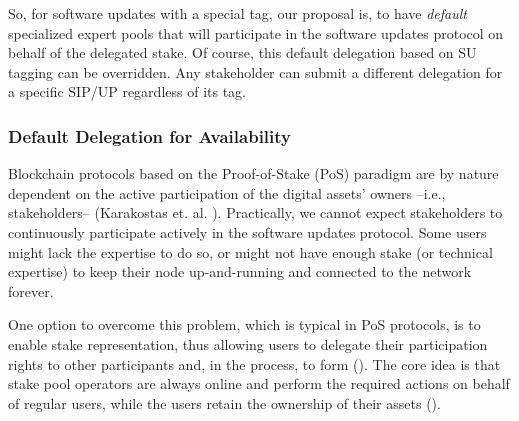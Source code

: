So, for software updates with a special tag, our proposal is, to have
\emph{default} specialized expert pools that will participate in the software
updates protocol on behalf of the delegated stake. Of course, this default
delegation based on SU tagging can be overridden. Any stakeholder can submit a
different delegation for a specific SIP/UP regardless of its tag.

\subsubsection{Default Delegation for Availability}\label{defaultdel}
Blockchain protocols based on the Proof-of-Stake (PoS) paradigm are by nature
dependent on the active participation of the digital assets' owners --i.e.,
stakeholders-- (Karakostas et. al. \cite{stakepools}). Practically, we cannot
expect stakeholders to continuously participate actively in the software updates
protocol. Some users might lack the expertise to do so, or might not have enough
stake (or technical expertise) to keep their node up-and-running and connected
to the network forever.

One option to overcome this problem, which is typical in PoS protocols, is to
enable stake representation, thus allowing users to delegate their participation
rights to other participants and, in the process, to form (\cite{stakepools}). The core idea is that stake pool operators are
always online and perform the required actions on behalf of regular users, while
the users retain the ownership of their assets (\cite{stakepools}).

